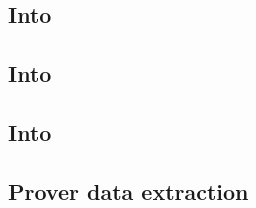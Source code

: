 \subsection{Into \wcpMod{}}         \label{block data: lookups: into wcp}                 
\subsection{Into \eucMod{}}         \label{block data: lookups: into euc}                 
\subsection{Into \userTxnDataMod{}} \label{block data: lookups: into txn data}            
\subsection{Prover data extraction} \label{block data: lookups: prover data extraction}   
